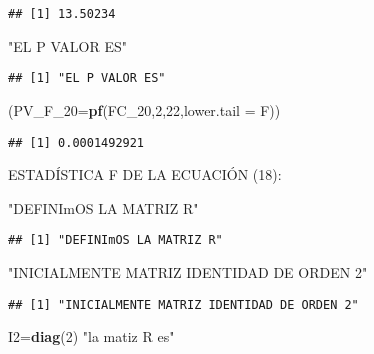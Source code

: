 \documentclass[
]{article}
\newenvironment{Shaded}{\begin{snugshade}}{\end{snugshade}}
\newcommand{\DataTypeTok}[1]{\textcolor[rgb]{0.13,0.29,0.53}{#1}}
\newcommand{\DecValTok}[1]{\textcolor[rgb]{0.00,0.00,0.81}{#1}}
\newcommand{\KeywordTok}[1]{\textcolor[rgb]{0.13,0.29,0.53}{\textbf{#1}}}
\newcommand{\NormalTok}[1]{#1}
\newcommand{\StringTok}[1]{\textcolor[rgb]{0.31,0.60,0.02}{#1}}
\begin{document}
\begin{verbatim}
## [1] 13.50234
\end{verbatim}

\begin{Shaded}
\begin{Highlighting}[]
\StringTok{"EL P VALOR ES"}
\end{Highlighting}
\end{Shaded}

\begin{verbatim}
## [1] "EL P VALOR ES"
\end{verbatim}

\begin{Shaded}
\begin{Highlighting}[]
\NormalTok{(}\DataTypeTok{PV_F_20=}\KeywordTok{pf}\NormalTok{(FC_}\DecValTok{20}\NormalTok{,}\DecValTok{2}\NormalTok{,}\DecValTok{22}\NormalTok{,}\DataTypeTok{lower.tail =}\NormalTok{ F))}
\end{Highlighting}
\end{Shaded}

\begin{verbatim}
## [1] 0.0001492921
\end{verbatim}

ESTADÍSTICA F DE LA ECUACIÓN (18):

\begin{Shaded}
\begin{Highlighting}[]
\StringTok{"DEFINImOS LA MATRIZ R"}
\end{Highlighting}
\end{Shaded}

\begin{verbatim}
## [1] "DEFINImOS LA MATRIZ R"
\end{verbatim}

\begin{Shaded}
\begin{Highlighting}[]
\StringTok{"INICIALMENTE MATRIZ IDENTIDAD DE ORDEN 2"}
\end{Highlighting}
\end{Shaded}

\begin{verbatim}
## [1] "INICIALMENTE MATRIZ IDENTIDAD DE ORDEN 2"
\end{verbatim}

\begin{Shaded}
\begin{Highlighting}[]
\NormalTok{I2=}\KeywordTok{diag}\NormalTok{(}\DecValTok{2}\NormalTok{)}
\StringTok{"la matiz R es"}
\end{Highlighting}
\end{Shaded}
\end{document}

